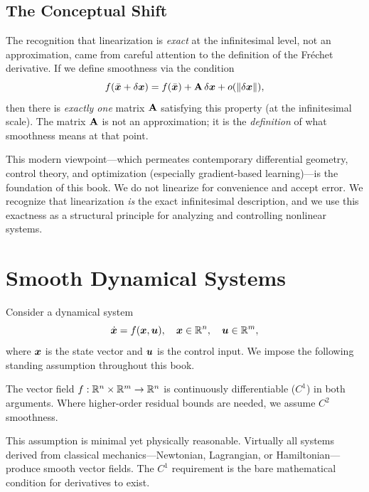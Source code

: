 \subsection{The Conceptual Shift}

The recognition that linearization is \emph{exact} at the infinitesimal level, not an
approximation, came from careful attention to the definition of the Fr\'echet derivative.
If we define smoothness via the condition
\begin{equation}
f(\bar{\bm{x}} + \delta\bm{x}) = f(\bar{\bm{x}}) + \mathbf{A}\,\delta\bm{x} + o(\left\lVert \delta\bm{x} \right\rVert),
\label{eq:ch1:frechet-heuristic}
\end{equation}
then there is \emph{exactly one} matrix $\mathbf{A}$ satisfying this property (at the infinitesimal
scale). The matrix $\mathbf{A}$ is not an approximation; it is the \emph{definition} of what
smoothness means at that point.

This modern viewpoint---which permeates contemporary differential geometry, control theory,
and optimization (especially gradient-based learning)---is the foundation of this book.
We do not linearize for convenience and accept error. We recognize that linearization
\emph{is} the exact infinitesimal description, and we use this exactness as a structural
principle for analyzing and controlling nonlinear systems.


\section{Smooth Dynamical Systems}

Consider a dynamical system
\begin{equation}
\dot{\bm{x}} = f(\bm{x}, \bm{u}), \quad \bm{x} \in \mathbb{R}^n, \quad \bm{u} \in \mathbb{R}^m,
\label{eq:ch1:dynamics}
\end{equation}
where $\bm{x}$ is the state vector and $\bm{u}$ is the control input. We impose the following
standing assumption throughout this book.

\begin{assumption}[Smoothness]\label{ass:smoothness}
The vector field $f:\mathbb{R}^n\times\mathbb{R}^m \to \mathbb{R}^n$ is continuously differentiable ($C^1$) in
both arguments. Where higher-order residual bounds are needed, we assume $C^2$ smoothness.
\end{assumption}

This assumption is minimal yet physically reasonable. Virtually all systems derived from
classical mechanics---Newtonian, Lagrangian, or Hamiltonian---produce smooth vector fields.
The $C^1$ requirement is the bare mathematical condition for derivatives to exist.

